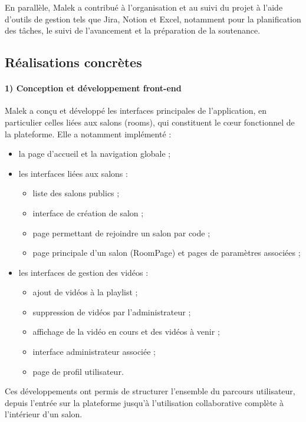\documentclass[12pt,a4paper]{report}
\begin{document}
En parallèle, Malek a contribué à l’organisation et au suivi du projet à l’aide d’outils de gestion tels que Jira, Notion et Excel, notamment pour la planification des tâches, le suivi de l’avancement et la préparation de la soutenance.

\subsection*{Réalisations concrètes}

\paragraph{1) Conception et développement front-end}
Malek a conçu et développé les interfaces principales de l’application, en particulier celles liées aux salons (rooms), qui constituent le cœur fonctionnel de la plateforme. Elle a notamment implémenté :

\begin{itemize}
  \item la page d’accueil et la navigation globale ;
  \item les interfaces liées aux salons :
  \begin{itemize}
    \item liste des salons publics ;
    \item interface de création de salon ;
    \item page permettant de rejoindre un salon par code ;
    \item page principale d’un salon (RoomPage) et pages de paramètres associées ;
  \end{itemize}
  \item les interfaces de gestion des vidéos :
  \begin{itemize}
    \item ajout de vidéos à la playlist ;
    \item suppression de vidéos par l’administrateur ;
    \item affichage de la vidéo en cours et des vidéos à venir ;
    \item interface administrateur associée ;
    \item page de profil utilisateur.
  \end{itemize}
\end{itemize}

Ces développements ont permis de structurer l’ensemble du parcours utilisateur, depuis l’entrée sur la plateforme jusqu’à l’utilisation collaborative complète à l’intérieur d’un salon.
\end{document}
